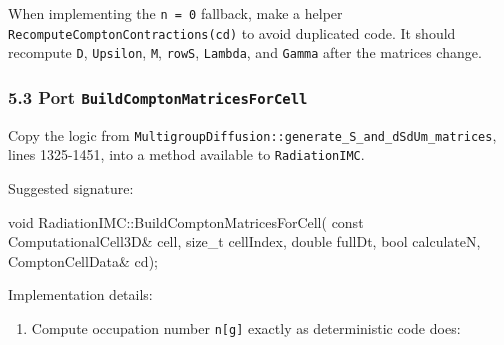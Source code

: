 \documentclass[
]{article}
\newenvironment{Shaded}{}{}
\newcommand{\AttributeTok}[1]{\textcolor[rgb]{0.49,0.56,0.16}{#1}}
\newcommand{\DataTypeTok}[1]{\textcolor[rgb]{0.56,0.13,0.00}{#1}}
\newcommand{\NormalTok}[1]{#1}
\newcommand{\OperatorTok}[1]{\textcolor[rgb]{0.40,0.40,0.40}{#1}}
\providecommand{\tightlist}{%
  \setlength{\itemsep}{0pt}\setlength{\parskip}{0pt}}
\begin{document}
When implementing the \texttt{n\ =\ 0} fallback, make a helper
\texttt{RecomputeComptonContractions(cd)} to avoid duplicated code. It
should recompute \texttt{D}, \texttt{Upsilon}, \texttt{M},
\texttt{rowS}, \texttt{Lambda}, and \texttt{Gamma} after the matrices
change.

\subsubsection{\texorpdfstring{5.3 Port
\texttt{BuildComptonMatricesForCell}}{5.3 Port BuildComptonMatricesForCell}}\label{port-buildcomptonmatricesforcell}

Copy the logic from
\texttt{MultigroupDiffusion::generate\_S\_and\_dSdUm\_matrices}, lines
1325-1451, into a method available to \texttt{RadiationIMC}.

Suggested signature:

\begin{Shaded}
\begin{Highlighting}[]
\DataTypeTok{void}\NormalTok{ RadiationIMC}\OperatorTok{::}\NormalTok{BuildComptonMatricesForCell}\OperatorTok{(}
    \AttributeTok{const}\NormalTok{ ComputationalCell3D}\OperatorTok{\&}\NormalTok{ cell}\OperatorTok{,}
    \DataTypeTok{size\_t}\NormalTok{ cellIndex}\OperatorTok{,}
    \DataTypeTok{double}\NormalTok{ fullDt}\OperatorTok{,}
    \DataTypeTok{bool}\NormalTok{ calculateN}\OperatorTok{,}
\NormalTok{    ComptonCellData}\OperatorTok{\&}\NormalTok{ cd}\OperatorTok{);}
\end{Highlighting}
\end{Shaded}

Implementation details:

\begin{enumerate}
\def\labelenumi{\arabic{enumi}.}
\tightlist
\item
  Compute occupation number \texttt{n{[}g{]}} exactly as deterministic
  code does:
\end{enumerate}
\end{document}
